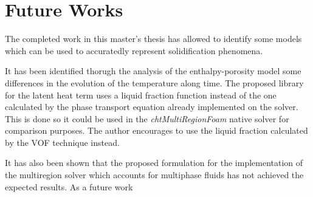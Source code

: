 \chapter{Future Works} %

\label{Chapter6}
\setlength{\parindent}{0.5cm} The completed work in this master's thesis has allowed to identify some models which can be used to accuratedly represent solidification phenomena. 

\noindent It has been identified thorugh the analysis of the enthalpy-porosity model some differences in the evolution of the temperature along time. The proposed library for the latent heat term uses a liquid fraction function instead of the one calculated by the phase transport equation already implemented on the solver. This is done so it could be used in the \textit{chtMultiRegionFoam} native solver for comparison purposes. The author encourages to use the liquid fraction calculated by the VOF technique instead.

\noindent It has also been shown that the proposed formulation for the implementation of the multiregion solver which accounts for multiphase fluids has not achieved the expected results. As a future work  
